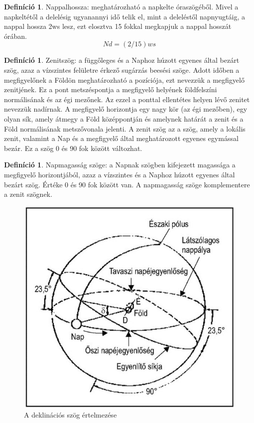 \documentclass[
]{thesis-ekf}
\theoremstyle{definition}
\newtheorem{definicio}[tetel]{Definíció}
\theoremstyle{remark}
\begin{document}
			\begin{definicio}
				Nappalhossza: meghatározható a napkelte óraszögéből. Mivel a napkeltétől a delelésig ugyanannyi idő telik el, mint a deleléstől napnyugtáig, a nappal hossza 2ws lesz, ezt elosztva 15 fokkal megkapjuk a nappal hosszát órában.
				\[Nd = (2/15) ws\]
				\cite{Kornyezet}
			\end{definicio}
			\begin{definicio}
				Zenitszög: a függőleges és a Naphoz húzott egyenes által bezárt szög, azaz a vízszintes felületre érkező sugárzás beesési szöge. Adott időben a megfigyelőnek a Földön meghatározható a pozíciója, ezt nevezzük a megfigyelő zenitjének. Ez a pont metszéspontja a megfigyelő helyének földfelszíni normálisának és az égi mezőnek. Az ezzel a ponttal ellentétes helyen lévő zenitet nevezzük nadírnak. A megfigyelő horizontja egy nagy kör (az égi mezőben), egy olyan sík, amely átmegy a Föld középpontján és amelynek határát a zenit és a Föld normálisának metszővonala jelenti. A zenit szög az a szög, amely a lokális zenit, valamint a Nap és a megfigyelő által meghatározott egyenes egymással bezár. Ez a szög 0 és 90 fok között változhat.
				\cite{Kornyezet}
			\end{definicio}
			\begin{definicio}
				Napmagasság szöge: a Napnak szögben kifejezett magassága a megfigyelő horizontjából, azaz a vízszintes és a Naphoz húzott egyenes által bezárt szög. Értéke 0 és 90 fok között van. A napmagasság szöge komplementere a zenit szögnek.
				\cite{Kornyezet}
			\end{definicio}
			\begin{figure}[h]
				\centering
				\includegraphics[scale=0.30]{./images/declination}
				\caption{A deklinációs szög értelmezése}
				\label{fig:declination}
			\end{figure}
\end{document}
